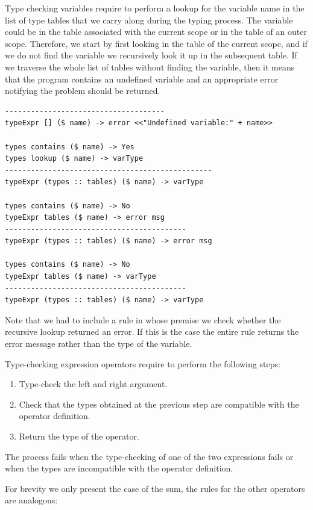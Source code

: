 \noindent
Type checking variables require to perform a lookup for the variable name in the list of type tables that we carry along during the typing process. The variable could be in the table associated with the current scope or in the table of an outer scope. Therefore, we start by first looking in the table of the current scope, and if we do not find the variable we recursively look it up in the subsequent table. If we traverse the whole list of tables without finding the variable, then it means that the program contains an undefined variable and an appropriate error notifying the problem should be returned.

\begin{lstlisting}
-------------------------------------
typeExpr [] ($ name) -> error <<"Undefined variable:" + name>>

types contains ($ name) -> Yes
types lookup ($ name) -> varType
------------------------------------------------
typeExpr (types :: tables) ($ name) -> varType

types contains ($ name) -> No
typeExpr tables ($ name) -> error msg
------------------------------------------
typeExpr (types :: tables) ($ name) -> error msg 

types contains ($ name) -> No
typeExpr tables ($ name) -> varType
------------------------------------------
typeExpr (types :: tables) ($ name) -> varType 
\end{lstlisting}

Note that we had to include a rule in whose premise we check whether the recursive lookup returned an error. If this is the case the entire rule returns the error message rather than the type of the variable.

Type-checking expression operators require to perform the following steps:

\begin{enumerate}[noitemsep]
	\item Type-check the left and right argument.
	\item Check that the types obtained at the previous step are compatible with the operator definition.
	\item Return the type of the operator.
\end{enumerate}

The process fails when the type-checking of one of the two expressions fails or when the types are incompatible with the operator definition.

\noindent
For brevity we only present the case of the sum, the rules for the other operators are analogous:

